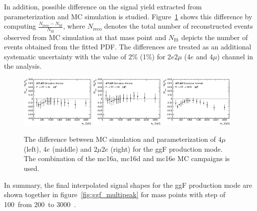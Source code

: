 In addition, possible difference on the signal yield extracted from parameterization and MC simulation is studied.
Figure~\ref{fig:ggf_graph_YieldCheckAll} shows this difference by computing $\frac{N_{\text{reco}}-N_{\text{fit}}}{N_{\text{fit}}}$, where $N_{\text{reco}}$ denotes the total number of reconstructed events observed from MC simulation at that mass point
and $N_{\text{fit}}$ depicts the number of events obtained from the fitted PDF.
The differences are treated as an additional systematic uncertainty with the value of 2\% (1\%) for 2$e$2$\mu$ (4$e$ and 4$\mu$) channel in the analysis.

\begin{figure}[htbp]
    \centering
    \includegraphics[width=0.32\textwidth]{figures/HMHZZ/signal/ggf_graph_YieldCheck_4mu_fixed.eps}
    \includegraphics[width=0.32\textwidth]{figures/HMHZZ/signal/ggf_graph_YieldCheck_4e_fixed.eps}
    \includegraphics[width=0.32\textwidth]{figures/HMHZZ/signal/ggf_graph_YieldCheck_2mu2e_fixed.eps}
    \caption{The difference between MC simulation and parameterization of
    $4\mu$ (left), $4e$ (middle) and $2\mu 2e$ (right) for the ggF production
    mode. The combination of the mc16a, mc16d and mc16e MC campaigns is used.}
    \label{fig:ggf_graph_YieldCheckAll}
\end{figure}

In summary, the final interpolated signal shapes for the ggF production mode are shown together in figure~\ref{fig:ggf_multipeak} for mass points with step of 100~\gev from 200~\gev to 3000~\gev.

